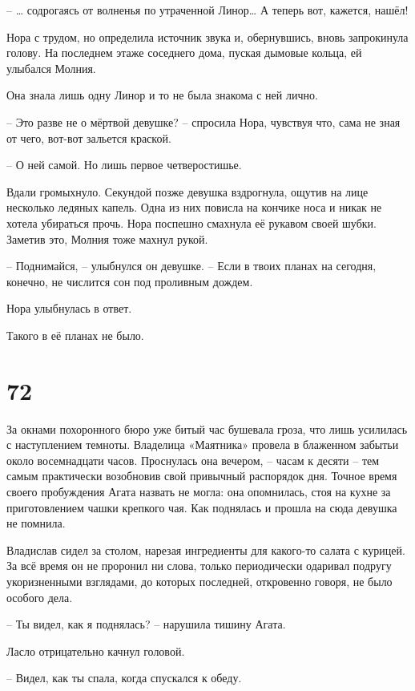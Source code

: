 \documentclass[
  a5paperpaper,
  DIV=11,
  numbers=noendperiod]{scrreprt}
\begin{document}
-- \ldots{} содрогаясь от волненья по утраченной Линор\ldots{} А теперь
вот, кажется, нашёл!

Нора с трудом, но определила источник звука и, обернувшись, вновь
запрокинула голову. На последнем этаже соседнего дома, пуская дымовые
кольца, ей улыбался Молния.

Она знала лишь одну Линор и то не была знакома с ней лично.

-- Это разве не о мёртвой девушке? -- спросила Нора, чувствуя что, сама
не зная от чего, вот-вот зальется краской.

-- О ней самой. Но лишь первое четверостишье.

Вдали громыхнуло. Секундой позже девушка вздрогнула, ощутив на лице
несколько ледяных капель. Одна из них повисла на кончике носа и никак не
хотела убираться прочь. Нора поспешно смахнула её рукавом своей шубки.
Заметив это, Молния тоже махнул рукой.

-- Поднимайся, -- улыбнулся он девушке. -- Если в твоих планах на
сегодня, конечно, не числится сон под проливным дождем.

Нора улыбнулась в ответ.

Такого в её планах не было.

\section*{72}\label{72}


За окнами похоронного бюро уже битый час бушевала гроза, что лишь
усилилась с наступлением темноты. Владелица «Маятника» провела в
блаженном забытьи около восемнадцати часов. Проснулась она вечером, --
часам к десяти -- тем самым практически возобновив свой привычный
распорядок дня. Точное время своего пробуждения Агата назвать не могла:
она опомнилась, стоя на кухне за приготовлением чашки крепкого чая. Как
поднялась и прошла на сюда девушка не помнила.

Владислав сидел за столом, нарезая ингредиенты для какого-то салата с
курицей. За всё время он не проронил ни слова, только периодически
одаривал подругу укоризненными взглядами, до которых последней,
откровенно говоря, не было особого дела.

-- Ты видел, как я поднялась? -- нарушила тишину Агата.

Ласло отрицательно качнул головой.

-- Видел, как ты спала, когда спускался к обеду.
\end{document}

